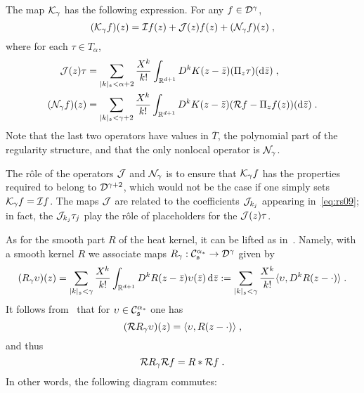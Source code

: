 \documentclass[reqno,11pt]{article}
\def\fraks{\mathfrak{s}}
\def\abss#1{\abs{#1}_\mathfrak{s}}
\begin{document}
\begin{center}
\end{center}

The map ${\mathcal K}_\gamma$ has the following expression. For any $f\in{\mathcal D}^\gamma$, 
\begin{equation}
 \label{eq:K_gamma2}
 (\cK_\gamma f)(z) = \cI f(z) + \cJ(z)f(z) + (\cN_\gamma f)(z)\;,
\end{equation} 
where for each $\tau\in T_\alpha$, 
\begin{align}
\label{eq:K_gamma3}  
\cJ(z)\tau &= \sum_{\abss{k} < \alpha+2}
\frac{X^k}{k!} \int_{\R^{d+1}} D^k K(z-\bar z)(\Pi_z\tau)(\6\bar z)\;, \\
\label{eq:K_gamma4}  
(\cN_\gamma f)(z) &= \sum_{\abss{k} < \gamma+2}
\frac{X^k}{k!} \int_{\R^{d+1}} D^k K(z-\bar z)(\cR f - \Pi_z f(z))(\6\bar z)\;.
\end{align}
Note that the last two operators have values in $\overline T$, the polynomial
part of the regularity structure, and that the only nonlocal operator is
${\mathcal N}_\gamma$. 

The r\^ole of the operators ${\mathcal J}$ and ${\mathcal N}_\gamma$ is to ensure that
${\mathcal K}_\gamma f$ has the properties required to belong to ${\mathcal D}^{\gamma+2}$, which
would not be the case if one simply sets ${\mathcal K}_\gamma f = {\mathcal I} f$. The maps ${\mathcal J}$
are related to the coefficients ${\mathcal J}_{k_j}$ appearing in~\eqref{eq:rs09}; in
fact, the ${\mathcal J}_{k_j}\tau_j$ play the r\^ole of placeholders for the
${\mathcal J}(z)\tau$. 

As for the smooth part $R$ of the heat kernel, it can be lifted as
in~\cite[(7.7)]{Hairer2014}. Namely, with a smooth kernel $R$ we associate
maps $R_\gamma: \cC^{\alpha_*}_{\fraks} \to \cD^\gamma$ given by 
\begin{equation}
 \label{eq:R_gamma}
 (R_\gamma \upsilon)(z) 
 = \sum_{\abss{k}<\gamma} \frac{X^k}{k!} 
 \int_{\R^{d+1}} D^k R(z-\bar z) \upsilon(\bar z)\6\bar z
 := \sum_{\abss{k}<\gamma} \frac{X^k}{k!} 
 \pscal{\upsilon}{D^k R(z-\cdot)}\;.
\end{equation} 
It follows from~\cite[Prop~3.28]{Hairer2014} that for
$\upsilon\in\cC^{\alpha_*}_{\fraks}$ one has 
\[
 ({\mathcal R} R_\gamma \upsilon)(z) = \langle\upsilon,R(z-\cdot)\rangle\;,
\]
and thus 
\begin{equation}
 \label{eq:R_gamma2}
 \cR R_\gamma \cR f = R * \cR f\;.
\end{equation} 
In other words, the following diagram commutes:
\end{document}
